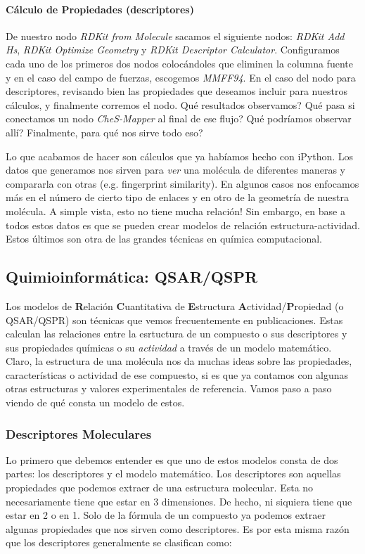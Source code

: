 \documentclass[10pt,letterpaper]{article}
\begin{document}
\paragraph{C\'alculo de Propiedades (descriptores)}
De nuestro nodo \textit{RDKit from Molecule} sacamos el siguiente nodos: \textit{RDKit Add Hs}, \textit{RDKit Optimize Geometry} y \textit{RDKit Descriptor Calculator}. Configuramos cada uno de los primeros dos nodos coloc\'andoles que eliminen la columna fuente y en el caso del campo de fuerzas, escogemos \emph{MMFF94}. En el caso del nodo para descriptores, revisando bien las propiedades que deseamos incluir para nuestros c\'alculos, y finalmente corremos el nodo. Qu\'e resultados observamos? Qu\'e pasa si conectamos un nodo \emph{CheS-Mapper} al final de ese flujo? Qu\'e podr\'iamos observar all\'i? Finalmente, para qu\'e nos sirve todo eso?

Lo que acabamos de hacer son c\'alculos que ya hab\'iamos hecho con iPython. Los datos que generamos nos sirven para \emph{ver} una mol\'ecula de diferentes maneras y compararla con otras (e.g. fingerprint similarity). En algunos casos nos enfocamos m\'as en el n\'umero de cierto tipo de enlaces y en otro de la geometr\'ia de nuestra mol\'ecula. A simple vista, esto no tiene mucha relaci\'on! Sin embargo, en base a todos estos datos es que se pueden crear modelos de relaci\'on estructura-actividad. Estos \'ultimos son otra de las grandes t\'ecnicas en qu\'imica computacional.

\subsection{Quimioinform\'atica: QSAR/QSPR}
Los modelos de \textbf{R}elaci\'on \textbf{C}uantitativa de \textbf{E}structura \textbf{A}ctividad/\textbf{P}ropiedad (o QSAR/QSPR) son t\'ecnicas que vemos frecuentemente en publicaciones. Estas calculan las relaciones entre la esrtuctura de un compuesto o sus descriptores y sus propiedades qu\'imicas o su \emph{actividad} a trav\'es de un modelo matem\'atico. Claro, la estructura de una mol\'ecula nos da muchas ideas sobre las propiedades, caracter\'isticas o actividad de ese compuesto, si es que ya contamos con algunas otras estructuras y valores experimentales de referencia. Vamos paso a paso viendo de qu\'e consta un modelo de estos.\\

\subsubsection{Descriptores Moleculares}
Lo primero que debemos entender es que uno de estos modelos consta de dos partes: los descriptores y el modelo matem\'atico. Los descriptores son aquellas propiedades que podemos extraer de una estructura molecular. Esta no necesariamente tiene que estar en 3 dimensiones. De hecho, ni siquiera tiene que estar en 2 o en 1. Solo de la f\'ormula de un compuesto ya podemos extraer algunas propiedades que nos sirven como descriptores. Es por esta misma raz\'on que los descriptores generalmente se clasifican como:
\end{document}

